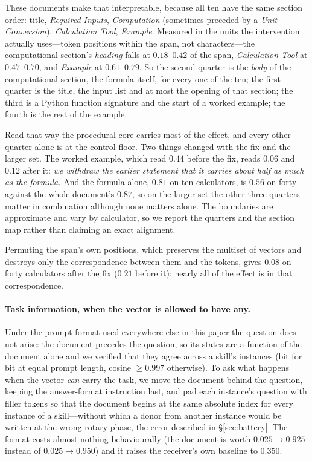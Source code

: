 \documentclass{article}
\begin{document}
These documents make that interpretable, because all ten have the same section
order: title, \emph{Required Inputs}, \emph{Computation} (sometimes preceded by a
\emph{Unit Conversion}), \emph{Calculation Tool}, \emph{Example}. Measured in the
units the intervention actually uses---token positions within the span, not
characters---the computational section's \emph{heading} falls at $0.18$--$0.42$
of the span, \emph{Calculation Tool} at $0.47$--$0.70$, and \emph{Example} at
$0.61$--$0.79$. So the second quarter is the \emph{body} of the computational
section, the formula itself, for every one of the ten; the first quarter is the
title, the input list and at most the opening of that section; the third is a
Python function signature and the start of a worked example; the fourth is the
rest of the example.

Read that way the procedural core carries most of the effect, and every other
quarter alone is at the control floor. Two things changed with the fix and the
larger set. The worked example, which read $0.44$ before the fix, reads $0.06$
and $0.12$ after it: \emph{we withdraw the earlier statement that it carries
about half as much as the formula.} And the formula alone, $0.81$ on ten
calculators, is $0.56$ on forty against the whole document's $0.87$, so on the
larger set the other three quarters matter in combination although none matters
alone. The boundaries are approximate and vary by calculator, so we report the
quarters and the section map rather than claiming an exact alignment.

Permuting the span's own positions, which preserves the multiset of vectors and
destroys only the correspondence between them and the tokens, gives $0.08$ on
forty calculators after the fix ($0.21$ before it): nearly all of the effect is
in that correspondence.



\paragraph{Task information, when the vector is allowed to have any.} Under the
prompt format used everywhere else in this paper the question does not arise:
the document precedes the question, so its states are a function of the document
alone and we verified that they agree across a skill's instances (bit for bit at
equal prompt length, cosine $\ge 0.997$ otherwise).
To ask what happens when the vector \emph{can} carry the task, we move the
document behind the question, keeping the answer-format instruction last, and
pad each instance's question with filler tokens so that the document begins at
the same absolute index for every instance of a skill---without which a donor
from another instance would be written at the wrong rotary phase, the error
described in \S\ref{sec:battery}. The format costs almost nothing behaviourally
(the document is worth $0.025 \to 0.925$ instead of $0.025 \to 0.950$) and it
raises the receiver's own baseline to $0.350$.
\end{document}
